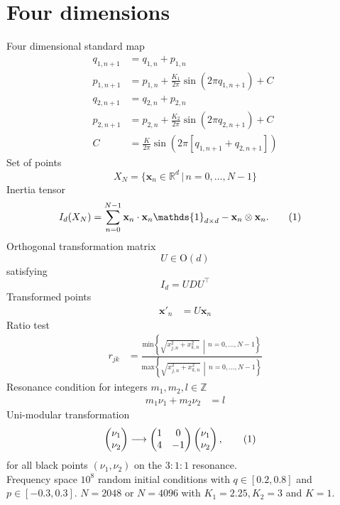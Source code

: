 \documentclass[english, parskip=full]{scrartcl}
\newcommand\numberthis{\addtocounter{equation}{1}\tag{\theequation}}
\newcommand{\kla}{}
\newcommand{\klammer}{}
\newcommand{\tecxt}{}
\begin{document}
\section{Four dimensions}
Four dimensional standard map
\begin{align*}
q_{1,n+1}&=q_{1,n}+p_{1,n}\\
p_{1,n+1}&=p_{1,n}+\frac{K_1}{2\pi}\sin\kla\left( {2\pi q_{1,n+1}} \right)+C\\
q_{2,n+1}&=q_{2,n}+p_{2,n}\\
p_{2,n+1}&=p_{2,n}+\frac{K_2}{2\pi}\sin\kla\left( {2\pi q_{2,n+1}} \right)+C\\
C&=\frac{K}{2\pi}\sin\kla\left( {2\pi[q_{1,n+1}+q_{2,n+1}]} \right)
\end{align*}
Set of points
$$X_N=\{\mathbf{x}_n\in\mathbb{R}^d\,\vert\,n=0,\dots,N-1\}$$
Inertia tensor
\begin{align*}
I_d(X_N)&=\sum_{n=0}^{N-1}\mathbf{x}_n\cdot \mathbf{x}_n \mathds{1}_{d\times d}-\mathbf{x}_n\otimes \mathbf{x}_n. \numberthis\label{eqn:InertiaTensor}
\end{align*}
Orthogonal transformation matrix 
$$U\in \text{O}(d)$$
satisfying 
$$I_d=U DU^\top$$
Transformed points
\begin{align*}
\mathbf{x}'_n&=U\mathbf{x}_n
\end{align*}
Ratio test
\begin{align*}
r_{jk}&=\frac{\tecxt\text{min}\klammer\left\{ \sqrt{x_{j,n}^2+x_{k,n}^2} \,\middle\vert\,n=0,\dots,N-1 \right\}}{\tecxt\text{max}\klammer\left\{\sqrt{x_{j,n}^2+x_{k,n}^2} \,\middle\vert\,n=0,\dots,N-1 \right\}}
\end{align*}
Resonance condition for integers $m_1,m_2,l\in\mathbb{Z}$
\begin{align*}
m_1\nu_1+m_2\nu_2&=l
\end{align*}
Uni-modular transformation
\begin{align*}
\begin{pmatrix}
\nu_1 \\ \nu_2
\end{pmatrix}&\longrightarrow\begin{pmatrix}
1&0 \\ 4& -1
\end{pmatrix}\begin{pmatrix}
\nu_1 \\ \nu_2
\end{pmatrix}, \numberthis\label{eqn:UnimodularTransformation}
\end{align*}
for all black points $(\nu_1,\nu_2)$ on the $3:1:1$ resonance.\\
Frequency space $10^8$ random initial conditions with $q\in [0.2, 0.8]$ and $p\in [-0.3, 0.3]$.
$N=2048$ or $N=4096$ with $K_1=2.25, K_2=3$ and $K=1$.
\end{document}
